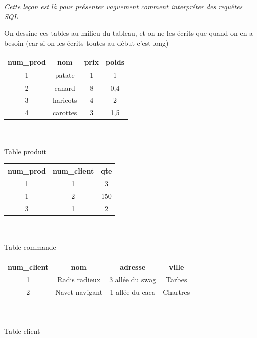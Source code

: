
\textit{Cette leçon est là pour présenter vaguement comment interpréter des requêtes SQL}

\begin{com}
	On dessine ces tables au milieu du tableau, et on ne les écrits que quand on en a besoin (car si on les écrits toutes au début c'est long)
\end{com}

\begin{minipage}{0.5\linewidth}
	\begin{center}
		\begin{tabular}{|c|c|c|c|}
			\multicolumn{1}{c}{num\_prod} & \multicolumn{1}{c}{nom} & \multicolumn{1}{c}{prix} & \multicolumn{1}{c}{poids} \\ \hline
			1 & patate & 1 & 1 \\ \hline 
			2 & canard & 8 & 0,4 \\ \hline
			3 & haricots & 4 & 2 \\ \hline
			4 & carottes & 3 & 1,5 \\ \hline
		\end{tabular}\\ \enspace \\
		Table produit
	\end{center}
\end{minipage}
\begin{minipage}{0.5\linewidth}
	\begin{center}
		\begin{tabular}{|c|c|c|}
			\multicolumn{1}{c}{num\_prod} & \multicolumn{1}{c}{num\_client} & \multicolumn{1}{c}{qte}  \\ \hline
			1 & 1 & 3 \\ \hline 
			1 & 2 & 150 \\ \hline
			3 & 1 & 2 \\ \hline
		\end{tabular}\\\enspace\\
		Table commande
	\end{center}
\end{minipage}

\begin{center}
	\begin{tabular}{|c|c|c|c|}
		\multicolumn{1}{c}{num\_client} & \multicolumn{1}{c}{nom} & \multicolumn{1}{c}{adresse} & \multicolumn{1}{c}{ville} \\ \hline
		1 & Radis radieux & 3 allée du swag & Tarbes \\ \hline 
		2 & Navet navigant & 1 allée du caca & Chartres \\ \hline
	\end{tabular}\\ \enspace \\
	Table client
\end{center}

